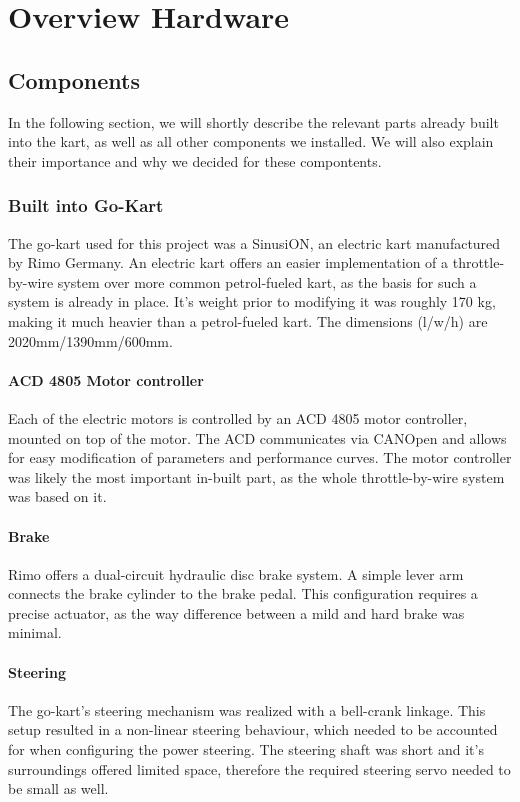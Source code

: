 
\chapter{Overview Hardware}
\label{chp:Hardware}

\section{Components}
In the following section, we will shortly describe the relevant parts already built into the kart, as well as all other components we installed. We will also explain their importance and why we decided for these compontents.

\subsection{Built into Go-Kart}

The go-kart used for this project was a SinusiON, an electric kart manufactured by Rimo Germany. An electric kart offers an easier implementation of a throttle-by-wire system over more common petrol-fueled kart, as the basis for such a system is already in place. 
It's weight prior to modifying it was roughly 170 kg, making it much heavier than a petrol-fueled kart. The dimensions (l/w/h) are 2020mm/1390mm/600mm.


\subsubsection{ACD 4805 Motor controller}
Each of the electric motors is controlled by an ACD 4805 motor controller, mounted on top of the motor. The ACD communicates via CANOpen and allows for easy modification of parameters and performance curves. The motor controller was likely the most important in-built part, as the whole throttle-by-wire system was based on it.


\subsubsection{Brake}
Rimo offers a dual-circuit hydraulic disc brake system. A simple lever arm connects the brake cylinder to the brake pedal. This configuration requires a precise actuator, as the way difference between a mild and hard brake was minimal. 

\subsubsection{Steering}
The go-kart's steering mechanism was realized with a bell-crank linkage. This setup resulted in a non-linear steering behaviour, which needed to be accounted for when configuring the power steering. The steering shaft was short and it's surroundings offered limited space, therefore the required steering servo needed to be small as well.



